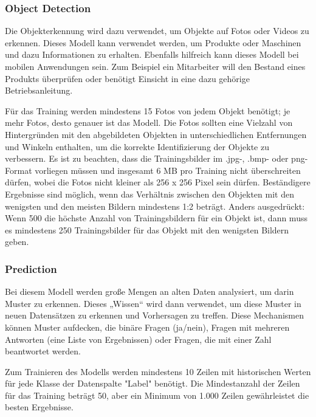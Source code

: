 \subsubsection{Object Detection}

Die Objekterkennung wird dazu verwendet, um Objekte auf Fotos oder Videos zu erkennen. Dieses Modell kann verwendet werden, um Produkte oder Maschinen und dazu Informationen zu erhalten. Ebenfalls hilfreich kann dieses Modell bei mobilen Anwendungen sein. Zum Beispiel ein Mitarbeiter will den Bestand eines Produkts überprüfen oder benötigt Einsicht in eine dazu gehörige Betriebsanleitung.

Für das Training werden mindestens 15 Fotos von jedem Objekt benötigt; je mehr Fotos, desto genauer ist das Modell. Die Fotos sollten eine Vielzahl von Hintergründen mit den abgebildeten Objekten in unterschiedlichen Entfernungen und Winkeln enthalten, um die korrekte Identifizierung der Objekte zu verbessern. Es ist zu beachten, dass die Trainingsbilder im .jpg-, .bmp- oder png-Format vorliegen müssen und insgesamt 6 MB pro Training nicht überschreiten dürfen, wobei die Fotos nicht kleiner als 256 x 256 Pixel sein dürfen. Beständigere Ergebnisse sind möglich, wenn das Verhältnis zwischen den Objekten mit den wenigsten und den meisten Bildern mindestens 1:2 beträgt. Anders ausgedrückt: Wenn 500 die höchste Anzahl von Trainingsbildern für ein Objekt ist, dann muss es mindestens 250 Trainingsbilder für das Objekt mit den wenigsten Bildern geben.

\subsubsection{Prediction}

Bei diesem Modell werden große Mengen an alten Daten analysiert, um darin Muster zu erkennen. Dieses „Wissen“ wird dann verwendet, um diese Muster in neuen Datensätzen zu erkennen und Vorhersagen zu treffen. Diese Mechanismen können Muster aufdecken, die binäre Fragen (ja/nein), Fragen mit mehreren Antworten (eine Liste von Ergebnissen) oder Fragen, die mit einer Zahl beantwortet werden.

Zum Trainieren des Modells werden mindestens 10 Zeilen mit historischen Werten für jede Klasse der Datenspalte "Label" benötigt. Die Mindestanzahl der Zeilen für das Training beträgt 50, aber ein Minimum von 1.000 Zeilen gewährleistet die besten Ergebnisse.

